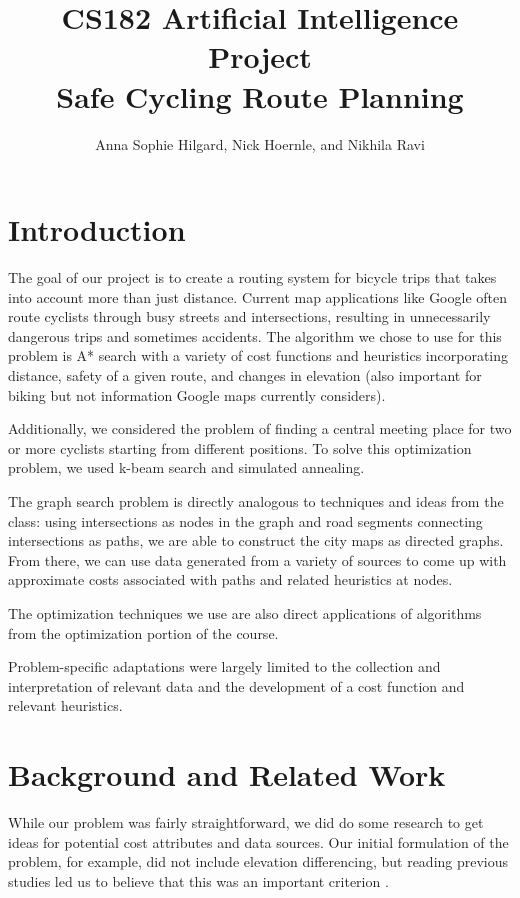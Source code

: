 \documentclass[11pt]{article}
\title{CS182 Artificial Intelligence Project \\ \Large{Safe Cycling Route Planning}}
\author{Anna Sophie Hilgard, Nick Hoernle, and Nikhila Ravi}
\begin{document}
\maketitle{}


\section{Introduction}

The goal of our project is to create a routing system for bicycle trips that takes into account more than just distance. Current map applications like Google often route cyclists through busy streets and intersections, resulting in unnecessarily dangerous trips and sometimes accidents. The algorithm we chose to use for this problem is A* search with a variety of cost functions and heuristics incorporating distance, safety of a given route, and changes in elevation (also important for biking but not information Google maps currently considers).

Additionally, we considered the problem of finding a central meeting place for two or more cyclists starting from different positions. To solve this optimization problem, we used k-beam search and simulated annealing.

The graph search problem is directly analogous to techniques and ideas from the class: using intersections as nodes in the graph and road segments connecting intersections as paths, we are able to construct the city maps as directed graphs. From there, we can use data generated from a variety of sources to come up with approximate costs associated with paths and related heuristics at nodes.

The optimization techniques we use are also direct applications of algorithms from the optimization portion of the course.

Problem-specific adaptations were largely limited to the collection and interpretation of relevant data and the development of a cost function and relevant heuristics.

\section{Background and Related Work}

While our problem was fairly straightforward, we did do some research to get ideas for potential cost attributes and data sources. Our initial formulation of the problem, for example, did not include elevation differencing, but reading previous studies led us to believe that this was an important criterion \cite{pmbr}.
\end{document}
